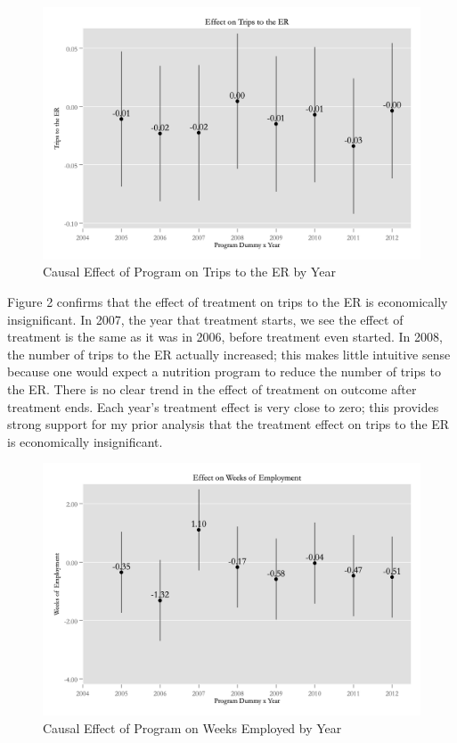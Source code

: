 \documentclass[a4paper]{article}
\begin{document}
\begin{figure}[H]
\centering
 \includegraphics[width=.95\textwidth]{fig_year_er.png}
 \caption{Causal Effect of Program on Trips to the ER by Year}
  \label{fig:SC}
 \end{figure}
 
Figure 2 confirms that the effect of treatment on trips to the ER is economically insignificant. In 2007, the year that treatment starts, we see the effect of treatment is the same as it was in 2006, before treatment even started. In 2008, the number of trips to the ER actually increased; this makes little intuitive sense because one would expect a nutrition program to reduce the number of trips to the ER. There is no clear trend in the effect of treatment on outcome after treatment ends. Each year’s treatment effect is very close to zero; this provides strong support for my prior analysis that the treatment effect on trips to the ER is economically insignificant.


\begin{figure}[H]
\centering
 \includegraphics[width=.95\textwidth]{fig_year_employ.png}
 \caption{Causal Effect of Program on Weeks Employed by Year}
  \label{fig:SC}
 \end{figure}
 
\end{document}
